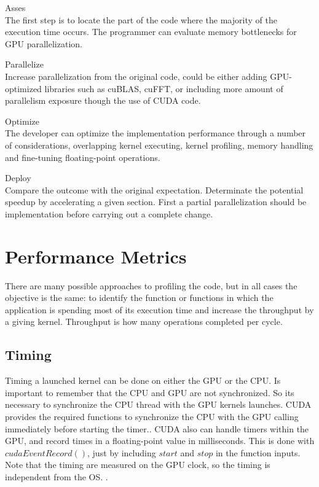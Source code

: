 \begin{description}

 \item{Asses} \hfill \\
 The first step is to locate the part of the code where the majority of the execution time occurs. The programmer can evaluate memory bottlenecks for GPU parallelization.
 \item{Parallelize} \hfill \\
 Increase parallelization from the original code, could be either adding GPU-optimized libraries such as cuBLAS, cuFFT, or including more amount of parallelism exposure though the use of CUDA code.
 \item{Optimize} \hfill \\
The developer can optimize the implementation performance through a number of considerations, overlapping kernel executing, kernel profiling, memory handling and fine-tuning floating-point operations.
 \item{Deploy} \hfill \\
 Compare the outcome with the original expectation. Determinate the potential speedup by accelerating a given section. First a partial parallelization should be implementation before carrying out a complete change.
 \end{description}


\section{Performance Metrics}

There are many possible approaches to profiling the code, but in all cases the objective is the same: to identify the function or functions in which the application is spending most of its execution time and increase the throughput by a giving kernel. Throughput is how many operations completed per cycle.

\subsection{Timing}

Timing a launched kernel can be done on either the GPU or the CPU. Is important to remember that the CPU and GPU are not synchronized. So its necessary to synchronize the CPU thread with the GPU kernels launches. CUDA provides the required  functions to synchronize the CPU with the GPU calling immediately before starting the timer.\cite{practices}.  CUDA also can handle timers within the GPU, and record times in a floating-point value in milliseconds. This is done with $cudaEventRecord()$, just by including $start$ and $stop$ in the function inputs. Note that the timing are measured on the GPU clock, so the timing is independent from the OS. \cite{cook}.

